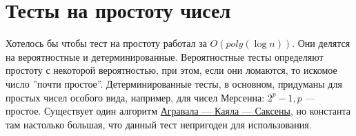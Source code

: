 
\section{Тесты на простоту чисел}
Хотелось бы чтобы тест на простоту работал за \(O(poly(\log n))\). Они делятся на вероятностные и детерминированные. Вероятностные тесты определяют простоту с некоторой вероятностью, при этом, если они ломаются, то искомое число ''почти простое''. Детерминированные тесты, в основном, придуманы для простых чисел особого вида, например, для чисел Мерсенна: \(2^p - 1, p\) --- простое. Существует один алгоритм \href{https://ru.wikipedia.org/wiki/Тест_Агравала_—_Каяла_—_Саксены}{Агравала — Каяла — Саксены}, но константа там настолько большая, что данный тест непригоден для использования.

